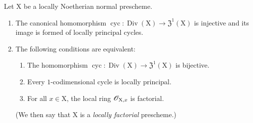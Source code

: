 \begin{theorem}[21.6.9]
\label{IV.21.6.9}
Let $\mathrm{X}$ be a locally Noetherian \textup{normal} prescheme.
\begin{enumerate}[label=\textup{(\roman*)}]
  \item The canonical homomorphism $\operatorname{cyc}:\operatorname{Div}(\mathrm{X})\to\mathfrak{Z}^1(\mathrm{X})$ is injective and its image is formed of locally principal cycles.
  \item The following conditions are equivalent:
  \begin{enumerate}[label=\emph{\alph*)}]
    \item The homomorphism $\operatorname{cyc}:\operatorname{Div}(\mathrm{X})\to\mathfrak{Z}^1(\mathrm{X})$ is bijective.
    \item Every $1$-codimensional cycle is locally principal.
    \item For all $x\in\mathrm{X}$, the local ring $\mathscr{O}_{\mathrm{X},x}$ is factorial.
  \end{enumerate}
  \textup{(We then say that $\mathrm{X}$ is a \emph{locally factorial} prescheme.)}
\end{enumerate}
\end{theorem}

